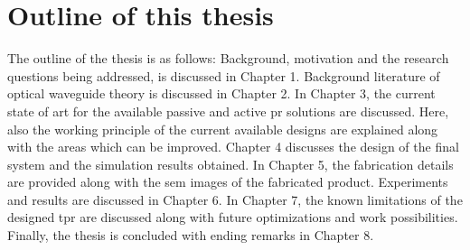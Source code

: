 \documentclass[../report.tex]{subfiles}
\begin{document}
	\section{Outline of this thesis}
The outline of the thesis is as follows: Background, motivation and the research questions being addressed, is discussed in Chapter 1. Background literature of optical waveguide theory is discussed in Chapter 2. In Chapter 3, the current state of art for the available passive and active \gls{pr} solutions are discussed. Here, also the working principle of the current available designs are explained along with the areas which can be improved. Chapter 4 discusses the design of the final system and the simulation results obtained. In Chapter 5, the fabrication details are provided along with the \gls{sem} images of the fabricated product. Experiments and results are discussed in Chapter 6. In Chapter 7, the known limitations of the designed \gls{tpr} are discussed along with future optimizations and work possibilities. Finally, the thesis is concluded with ending remarks in Chapter 8.
	
\end{document}

